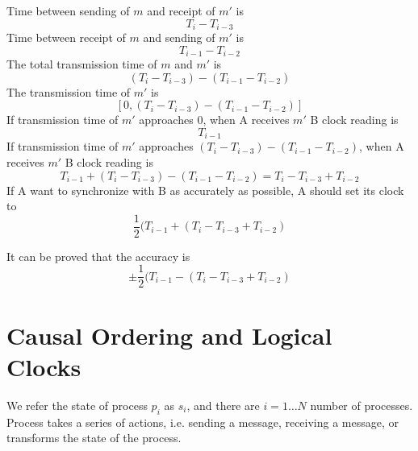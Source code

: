 \begin{multicols*}{2}
\begin{center}
\end{center}

\noindent Time between sending of $m$ and receipt of $m'$ is $$T_i - T_{i-3}$$
\noindent Time between receipt of $m$ and sending of $m'$ is $$T_{i-1} - T_{i-2}$$
\noindent The total transmission time of $m$ and $m'$ is $$(T_i - T_{i-3}) - (T_{i-1} - T_{i-2})$$
\noindent The transmission time of $m'$ is $$[0,(T_i - T_{i-3}) - (T_{i-1} - T_{i-2})]$$
\noindent If transmission time of $m'$ approaches $0$, when A receives $m'$ B clock reading is $$T_{i-1}$$
\noindent If transmission time of $m'$ approaches $(T_i - T_{i-3}) - (T_{i-1} - T_{i-2})$, when A receives $m'$ B clock reading is $$T_{i-1} + (T_i - T_{i-3}) - (T_{i-1} - T_{i-2}) = T_i - T_{i-3} + T_{i-2}$$
\noindent If A want to synchronize with B as accurately as possible, A should set its clock to $$\frac{1}{2}(T_{i-1} + (T_i - T_{i-3} + T_{i-2})$$

\noindent It can be proved that the accuracy is $$\pm \frac{1}{2}(T_{i-1} - (T_i - T_{i-3} + T_{i-2})$$

\section{Causal Ordering and Logical Clocks}

\noindent We refer the state of process $p_i$ as $s_i$, and there are $i=1\ldots N$ number of processes.\\

\noindent Process takes a series of actions, i.e. sending a message, receiving a message, or transforms the state of the process.\\


\end{multicols*}
